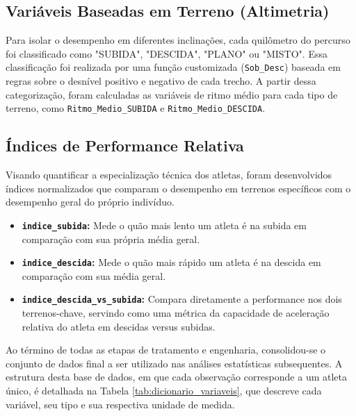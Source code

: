 \subsection{Variáveis Baseadas em Terreno (Altimetria)}

Para isolar o desempenho em diferentes inclinações, cada quilômetro do percurso foi classificado como "SUBIDA", "DESCIDA", "PLANO" ou "MISTO". Essa classificação foi realizada por uma função customizada (\texttt{Sob\_Desc}) baseada em regras sobre o desnível positivo e negativo de cada trecho. A partir dessa categorização, foram calculadas as variáveis de ritmo médio para cada tipo de terreno, como \texttt{Ritmo\_Medio\_SUBIDA} e \texttt{Ritmo\_Medio\_DESCIDA}.

\subsection{Índices de Performance Relativa}

Visando quantificar a especialização técnica dos atletas, foram desenvolvidos índices normalizados que comparam o desempenho em terrenos específicos com o desempenho geral do próprio indivíduo.
\begin{itemize}
    \item \textbf{\texttt{indice\_subida}:} Mede o quão mais lento um atleta é na subida em comparação com sua própria média geral.
    \item \textbf{\texttt{indice\_descida}:} Mede o quão mais rápido um atleta é na descida em comparação com sua média geral.
    \item \textbf{\texttt{indice\_descida\_vs\_subida}:} Compara diretamente a performance nos dois terrenos-chave, servindo como uma métrica da capacidade de aceleração relativa do atleta em descidas versus subidas.
\end{itemize}

Ao término de todas as etapas de tratamento e engenharia, consolidou-se o conjunto de dados final a ser utilizado nas análises estatísticas subsequentes. A estrutura desta base de dados, em que cada observação corresponde a um atleta único, é detalhada na Tabela \ref{tab:dicionario_variaveis}, que descreve cada variável, seu tipo e sua respectiva unidade de medida.

\renewcommand{\arraystretch}{1.5}

